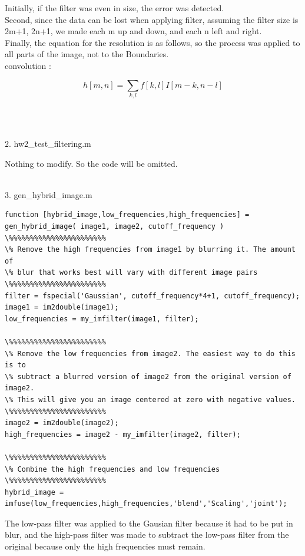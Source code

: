 Initially, if the filter was even in size, the error was detected.\\ Second, since the data can be lost when applying filter, assuming the filter size is 2m+1, 2n+1, we made each m up and down, and  each n left and right.\\ Finally, the equation for the resolution is as follows, so the process was applied to all parts of the image, not to the Boundaries.\\
convolution : \begin{Large} $$h[m,n] = \sum_{k,l} f[k,l]I[m-k,n-l]$$ \end{Large}\\\\

{\large $2.$ hw$2$\_test\_filtering.m \par}
\tab Nothing to modify. So the code will be omitted.\\\\


{\large $3.$ gen\_hybrid\_image.m \par}
\begin{lstlisting}[style=Matlab-editor]
function [hybrid_image,low_frequencies,high_frequencies] = gen_hybrid_image( image1, image2, cutoff_frequency )
\%%%%%%%%%%%%%%%%%%%%%%%
\% Remove the high frequencies from image1 by blurring it. The amount of
\% blur that works best will vary with different image pairs
\%%%%%%%%%%%%%%%%%%%%%%%
filter = fspecial('Gaussian', cutoff_frequency*4+1, cutoff_frequency);
image1 = im2double(image1);
low_frequencies = my_imfilter(image1, filter);

\%%%%%%%%%%%%%%%%%%%%%%%
\% Remove the low frequencies from image2. The easiest way to do this is to
\% subtract a blurred version of image2 from the original version of image2.
\% This will give you an image centered at zero with negative values.
\%%%%%%%%%%%%%%%%%%%%%%%
image2 = im2double(image2);
high_frequencies = image2 - my_imfilter(image2, filter);

\%%%%%%%%%%%%%%%%%%%%%%%
\% Combine the high frequencies and low frequencies
\%%%%%%%%%%%%%%%%%%%%%%%
hybrid_image = imfuse(low_frequencies,high_frequencies,'blend','Scaling','joint');
\end{lstlisting}

The low-pass filter was applied to the Gausian filter because it had to be put in blur, and the high-pass filter was made to subtract the low-pass filter from the original because only the high frequencies must remain.\\\\

